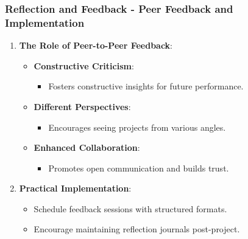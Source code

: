 \documentclass{beamer}
\begin{document}
\begin{frame}[fragile]
    \frametitle{Reflection and Feedback - Peer Feedback and Implementation}
    \begin{enumerate}
        \item \textbf{The Role of Peer-to-Peer Feedback}:
            \begin{itemize}
                \item \textbf{Constructive Criticism}:
                    \begin{itemize}
                        \item Fosters constructive insights for future performance.
                    \end{itemize}
                \item \textbf{Different Perspectives}:
                    \begin{itemize}
                        \item Encourages seeing projects from various angles.
                    \end{itemize}
                \item \textbf{Enhanced Collaboration}:
                    \begin{itemize}
                        \item Promotes open communication and builds trust.
                    \end{itemize}
            \end{itemize}

        \item \textbf{Practical Implementation}:
            \begin{itemize}
                \item Schedule feedback sessions with structured formats.
                \item Encourage maintaining reflection journals post-project.
            \end{itemize}
    \end{enumerate}
\end{frame}
\end{document}
